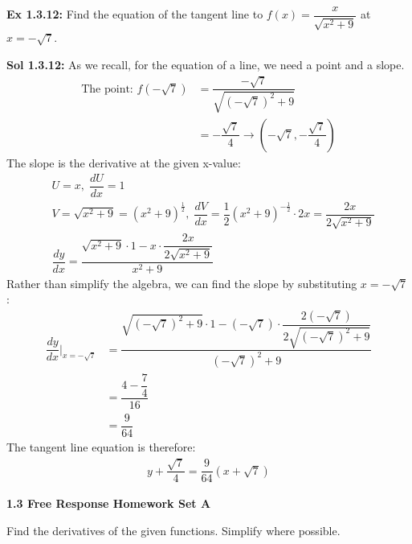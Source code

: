 \begin{tcolorbox}[example]
    \textbf{Ex 1.3.12: } Find the equation of the tangent line to $f(x) = \dfrac{x}{\sqrt{x^2 + 9}}$ at $x = -\sqrt{7}$.
\end{tcolorbox}
\begin{tcolorbox}[solution]
    \textbf{Sol 1.3.12: } As we recall, for the equation of a line, we need a point and a slope. \begin{align*}
        \text{The point: } f\left(-\sqrt{7}\right) & = \dfrac{-\sqrt{7}}{\sqrt{\left(-\sqrt{7}\right)^2 + 9}} \\[11pt]
        & = -\dfrac{\sqrt{7}}{4} \rightarrow \left(-\sqrt{7}, -\dfrac{\sqrt{7}}{4}\right) 
    \end{align*} 
    The slope is the derivative at the given x-value: \begin{align*}
        & U = x, \; \dfrac{dU}{dx} = 1 \\[11pt]
        & V = \sqrt{x^2 + 9} = \left(x^2 + 9\right)^\frac{1}{2}, \; \dfrac{dV}{dx} = \dfrac{1}{2}\left(x^2 + 9\right)^{-\frac{1}{2}} \cdot 2x = \dfrac{2x}{2\sqrt{x^2 + 9}} \\[11pt]
        & \dfrac{dy}{dx} = \dfrac{\sqrt{x^2 + 9} \cdot 1 - x \cdot \dfrac{2x}{2\sqrt{x^2 + 9}}}{x^2 + 9} 
    \end{align*} 
    Rather than simplify the algebra, we can find the slope by substituting $x = -\sqrt{7}$: \begin{align*}
        \dfrac{dy}{dx}\bigg|_{x = -\sqrt{7}} & = \dfrac{\sqrt{\left(-\sqrt{7}\right)^2 + 9} \cdot 1 - \left(-\sqrt{7}\right) \cdot \dfrac{2\left(-\sqrt{7}\right)}{2\sqrt{\left(-\sqrt{7}\right)^2 + 9}}}{\left(-\sqrt{7}\right)^2 + 9} \\[11pt]
        & = \dfrac{4 - \dfrac{7}{4}}{16} \\[11pt]
        & = \dfrac{9}{64}
    \end{align*} 
    The tangent line equation is therefore: \begin{align*}
        \boxed{y + \dfrac{\sqrt{7}}{4} = \dfrac{9}{64}\left(x + \sqrt{7}\right)} 
    \end{align*} 
\end{tcolorbox}

\newpage

\textbf{\large{1.3 Free Response Homework Set A}} \par

Find the derivatives of the given functions. Simplify where possible. \par

